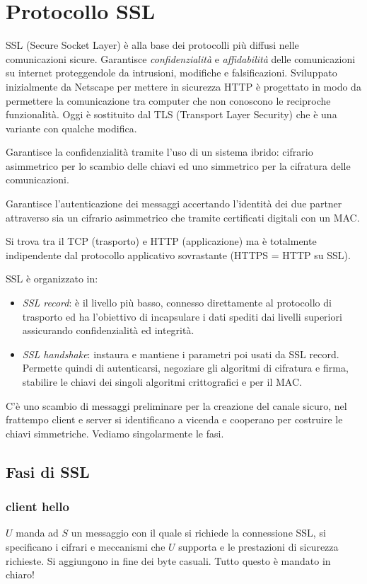 \section{Protocollo SSL}
SSL (Secure Socket Layer) è alla base dei protocolli più diffusi nelle comunicazioni sicure.
Garantisce \emph{confidenzialità} e \emph{affidabilità} delle comunicazioni su internet proteggendole da intrusioni, modifiche e falsificazioni.
Sviluppato inizialmente da Netscape per mettere in sicurezza HTTP è progettato in modo da permettere la comunicazione tra computer che non conoscono le reciproche funzionalità.
Oggi è sostituito dal TLS (Transport Layer Security) che è una variante con qualche modifica.

Garantisce la confidenzialità tramite l'uso di un sistema ibrido: cifrario asimmetrico per lo scambio delle chiavi ed uno simmetrico per la cifratura delle comunicazioni.

Garantisce l'autenticazione dei messaggi accertando l'identità dei due partner attraverso sia un cifrario asimmetrico che tramite certificati digitali con un MAC.

Si trova tra il TCP (trasporto) e HTTP (applicazione) ma è totalmente indipendente dal protocollo applicativo sovrastante (HTTPS = HTTP su SSL).

SSL è organizzato in:
\begin{itemize}
    \item \emph{SSL record}: è il livello più basso, connesso direttamente al protocollo di trasporto ed ha l'obiettivo di incapsulare i dati spediti dai livelli superiori assicurando confidenzialità ed integrità.
    \item \emph{SSL handshake}: instaura e mantiene i parametri poi usati da SSL record. Permette quindi di autenticarsi, negoziare gli algoritmi di cifratura e firma, stabilire le chiavi dei singoli algoritmi crittografici e per il MAC.
\end{itemize}

C'è uno scambio di messaggi preliminare per la creazione del canale sicuro, nel frattempo client e server si identificano a vicenda e cooperano per costruire le chiavi simmetriche. Vediamo singolarmente le fasi.

\subsection{Fasi di SSL}

\subsubsection{client hello}
$U$ manda ad $S$ un messaggio con il quale si richiede la connessione SSL, si specificano i cifrari e meccanismi che $U$ supporta e le prestazioni di sicurezza richieste.
Si aggiungono in fine dei byte casuali. Tutto questo è mandato in chiaro!

